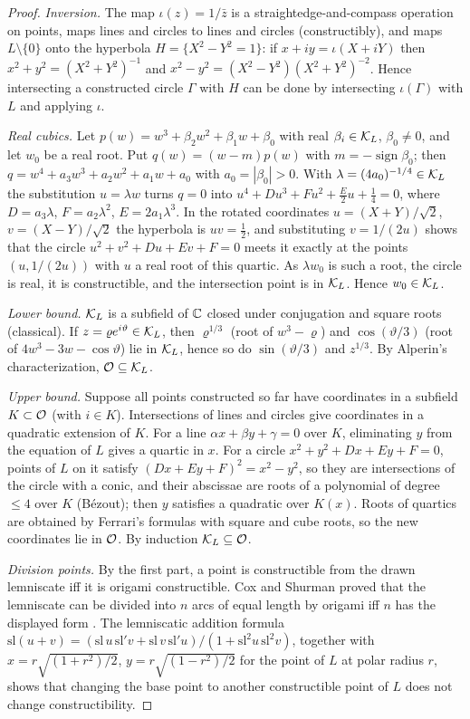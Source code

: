 \documentclass[11pt]{amsart}
\theoremstyle{definition}
\theoremstyle{remark}
\begin{document}
\begin{proof}
\emph{Inversion.} The map $\iota(z)=1/\bar z$ is a straightedge-and-compass
operation on points, maps lines and circles to lines and circles
(constructibly), and maps $L\setminus\{0\}$ onto the hyperbola
$H=\{X^2-Y^2=1\}$: if $x+iy=\iota(X+iY)$ then $x^2+y^2=(X^2+Y^2)^{-1}$ and
$x^2-y^2=(X^2-Y^2)(X^2+Y^2)^{-2}$. Hence intersecting a constructed circle
$\Gamma$ with $H$ can be done by intersecting $\iota(\Gamma)$ with $L$ and
applying $\iota$.

\emph{Real cubics.} Let $p(w)=w^3+\beta_2w^2+\beta_1w+\beta_0$ with real
$\beta_i\in\mathcal{K}_L$, $\beta_0\ne0$, and let $w_0$ be a real root. Put
$q(w)=(w-m)p(w)$ with $m=-\operatorname{sign}\beta_0$; then
$q=w^4+a_3w^3+a_2w^2+a_1w+a_0$ with $a_0=|\beta_0|>0$. With
$\lambda=(4a_0)^{-1/4}\in\mathcal{K}_L$ the substitution $u=\lambda w$ turns
$q=0$ into $u^4+Du^3+Fu^2+\tfrac E2u+\tfrac14=0$, where $D=a_3\lambda$,
$F=a_2\lambda^2$, $E=2a_1\lambda^3$. In the rotated coordinates
$u=(X+Y)/\sqrt2$, $v=(X-Y)/\sqrt2$ the hyperbola is $uv=\frac12$, and
substituting $v=1/(2u)$ shows that the circle
$u^2+v^2+Du+Ev+F=0$ meets it exactly at the points $(u,1/(2u))$ with $u$ a
real root of this quartic. As $\lambda w_0$ is such a root, the circle is
real, it is constructible, and the intersection point is in $\mathcal{K}_L$.
Hence $w_0\in\mathcal{K}_L$.

\emph{Lower bound.} $\mathcal{K}_L$ is a subfield of $\mathbb{C}$ closed under
conjugation and square roots (classical). If $z=\varrho e^{i\vartheta}\in
\mathcal{K}_L$, then $\varrho^{1/3}$ (root of $w^3-\varrho$) and
$\cos(\vartheta/3)$ (root of $4w^3-3w-\cos\vartheta$) lie in $\mathcal{K}_L$, hence
so do $\sin(\vartheta/3)$ and $z^{1/3}$. By Alperin's characterization,
$\mathcal{O}\subseteq\mathcal{K}_L$.

\emph{Upper bound.} Suppose all points constructed so far have coordinates in
a subfield $K\subset\mathcal{O}$ (with $i\in K$). Intersections of lines and circles
give coordinates in a quadratic extension of $K$. For a line
$\alpha x+\beta y+\gamma=0$ over $K$, eliminating $y$ from the equation of $L$
gives a quartic in $x$. For a circle $x^2+y^2+Dx+Ey+F=0$, points of $L$ on it
satisfy $(Dx+Ey+F)^2=x^2-y^2$, so they are intersections of the circle with a
conic, and their abscissae are roots of a polynomial of degree $\le4$ over
$K$ (Bézout); then $y$ satisfies a quadratic over $K(x)$. Roots of quartics
are obtained by Ferrari's formulas with square and cube roots, so the new
coordinates lie in $\mathcal{O}$. By induction $\mathcal{K}_L\subseteq\mathcal{O}$.

\emph{Division points.} By the first part, a point is constructible from the
drawn lemniscate iff it is origami constructible. Cox and Shurman proved that
the lemniscate can be divided into $n$ arcs of equal length by origami iff $n$
has the displayed form \cite[Lemniscate Theorem, part (2)]{R7-CoxShurman05}.
The lemniscatic addition formula
$\mathrm{sl}(u+v)=(\mathrm{sl}\,u\,\mathrm{sl}'v+\mathrm{sl}\,v\,\mathrm{sl}'u)/(1+\mathrm{sl}^2u\,\mathrm{sl}^2v)$,
together with $x=r\sqrt{(1+r^2)/2}$, $y=r\sqrt{(1-r^2)/2}$ for the point of
$L$ at polar radius $r$, shows that changing the base point to another
constructible point of $L$ does not change constructibility.
\end{proof}
\end{document}
